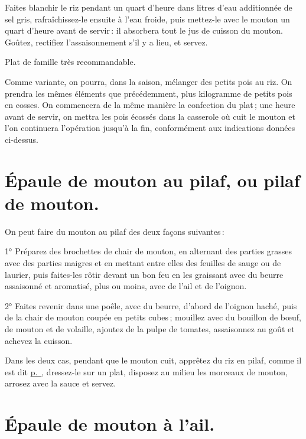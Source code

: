 Faites blanchir le riz pendant un quart d'heure dans {\mmm} litres d'eau additionnée
de sel gris, rafraîchissez-le ensuite à l'eau froide, puis mettez-le avec le
mouton un quart d'heure avant de servir : il absorbera tout le jus de cuisson
du mouton. Goûtez, rectifiez l'assaisonnement s'il y a lieu, et servez.

Plat de famille très recommandable.

\sk

Comme variante, on pourra, dans la saison, mélanger des petits pois au riz. On
prendra les mêmes éléments que précédemment, plus {\mmm} kilogramme de petits pois
en cosses. On commencera de la même manière la confection du plat ; une heure
avant de servir, on mettra les pois écossés dans la casserole où cuit le mouton
et l'on continuera l'opération jusqu'à la fin, conformément aux indications
données ci-dessus.

\section*{\centering Épaule de mouton au pilaf, ou pilaf de mouton.}
{}

On peut faire du mouton au pilaf des deux façons suivantes :

1° Préparez des brochettes de chair de mouton, en alternant des parties grasses
avec des parties maigres et en mettant entre elles des feuilles de sauge ou de
laurier, puis faites-les rôtir devant un bon feu en les graissant avec du
beurre assaisonné et aromatisé, plus ou moins, avec de l'ail et de l'oignon.

2° Faites revenir dans une poêle, avec du beurre, d'abord de l'oignon haché,
puis de la chair de mouton coupée en petits cubes ; mouillez avec du bouillon
de bœuf, de mouton et de volaille, ajoutez de la pulpe de tomates, assaisonnez
au goût et achevez la cuisson.

Dans les deux cas, pendant que le mouton cuit, apprêtez du riz en pilaf, comme
il est dit \hyperlink{p0712}{p. \pageref{pg0712}}, dressez-le sur un plat,
disposez au milieu les morceaux de mouton, arrosez avec la sauce et servez.

\section*{\centering Épaule de mouton à l'ail.}
{}

